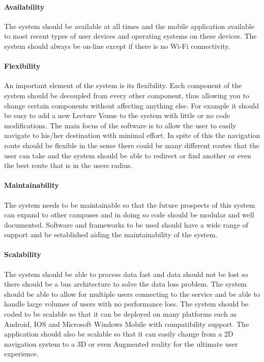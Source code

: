 \documentclass[runningheads,a4paper]{llncs}
\begin{document}
\paragraph{\textbf{Availability} \\}
 The system should be available at all times and the mobile application available to most recent types of user devices and operating systems on these devices. The system should always be on-line except if there is no Wi-Fi connectivity.

\paragraph{\textbf{Flexibility} \\}
 An important element of the system is its flexibility. 
 Each component of the system should be decoupled from every other component, thus allowing you to change certain components without affecting anything else. 
 For example it should be easy to add a new Lecture Venue to the system with little or no code modifications. 
 The main focus of the software is to allow the user to easily navigate to his/her destination with minimal effort.
 In spite of this the navigation route should be flexible in the sense there could be many different routes that the user can take and the system should be able to redirect or find another or even the best route that is in the users radius.

\paragraph{\textbf{Maintainability} \\}
 The system needs to be maintainable so that the future prospects of this system can expand to other campuses and in doing so code should be modular and well documented. Software and frameworks to be used should have a wide range of support and be established aiding the maintainability of the system.

\paragraph{\textbf{Scalability} \\}
 The system should be able to process data fast and data should not be lost so there should be a bus architecture to solve the data loss problem. The system should be able to allow for multiple users connecting to the service and be able to handle large volumes of users with no performance loss. The system should be coded to be scalable so that it can be deployed on many platforms such as Android, IOS and Microsoft Windows Mobile with compatibility support. The application should also be scalable so that it can easily change from a 2D navigation system to a 3D or even Augmented reality for the ultimate user experience.
\end{document}
